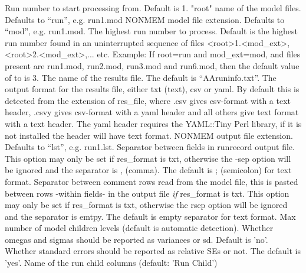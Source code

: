 \begin{optionlist}
Run number to start processing from. Default is 1. 
\nextopt
{}
"root" name of the model files. Defaults to “run”, e.g. run1.mod 
\nextopt
{}
NONMEM model file extension. Defaults to “mod”, e.g. run1.mod. 
\nextopt
{}
The highest run number to process. Default is the highest run number found in an uninterrupted sequence of files
<root>1.<mod\_ext>, <root>2.<mod\_ext>,... etc.
Example: If root=run and mod\_ext=mod, and files present are run1.mod, run2.mod, run3.mod and run6.mod,
then the default value of to is 3.
\nextopt
{}
The name of the results file. The default is “AAruninfo.txt”. 
\nextopt
{}
The output format for the results file, either txt (text), csv or yaml.  
By default this is detected from the extension of res\_file, 
where .csv gives csv-format with a text header, .csvy gives csv-format with 
a yaml header and all others give text format with a text header.
The yaml header requires the YAML::Tiny Perl library,
if it is not installed the header will have text format.
NONMEM output file extension. Defaults to “lst”, e.g. run1.lst. 
\nextopt
{}
Separator between fields in runrecord output file. This option may
only be set if res\_format is txt, otherwise the -sep option will be ignored 
and the separator is , (comma). The default is ; (semicolon) for text format.
\nextopt
{}
Separator between comment rows read from the model file, this is pasted 
between rows -within fields- in the output file \emph{if} res\_format is txt.
This option may only be set if res\_format is txt, otherwise the rsep option 
will be ignored and the separator is emtpy. The default is empty separator for text format.
\nextopt
{}
Max number of model children levels (default is automatic detection). 
\nextopt
{}
Whether omegas and sigmas should be reported as variances or sd. Default is 'no'. 
\nextopt
{}
Whether standard errors should be reported as relative SEs or not. The default is 'yes'. 
\nextopt
{}
Name of the run child columns (default: 'Run Child')
\nextopt
\end{optionlist}


